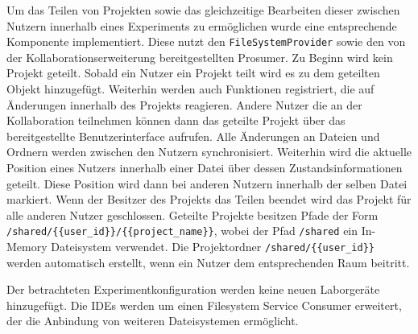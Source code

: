 Um das Teilen von Projekten sowie das gleichzeitige Bearbeiten dieser zwischen Nutzern innerhalb eines Experiments zu ermöglichen wurde eine entsprechende Komponente implementiert. Diese nutzt den \texttt{FileSystemProvider} sowie den von der Kollaborationserweiterung bereitgestellten Prosumer. Zu Beginn wird kein Projekt geteilt. Sobald ein Nutzer ein Projekt teilt wird es zu dem geteilten Objekt hinzugefügt. Weiterhin werden auch Funktionen registriert, die auf Änderungen innerhalb des Projekts reagieren. Andere Nutzer die an der Kollaboration teilnehmen können dann das geteilte Projekt über das bereitgestellte Benutzerinterface aufrufen. Alle Änderungen an Dateien und Ordnern werden zwischen den Nutzern synchronisiert. Weiterhin wird die aktuelle Position eines Nutzers innerhalb einer Datei über dessen Zustandsinformationen geteilt. Diese Position wird dann bei anderen Nutzern innerhalb der selben Datei markiert. Wenn der Besitzer des Projekts das Teilen beendet wird das Projekt für alle anderen Nutzer geschlossen. Geteilte Projekte besitzen Pfade der Form \texttt{/shared/\{\{user\_id\}\}/\{\{project\_name\}\}}, wobei der Pfad \texttt{/shared} ein In-Memory Dateisystem verwendet. Die Projektordner \texttt{/shared/\{\{user\_id\}\}} werden automatisch erstellt, wenn ein Nutzer dem entsprechenden Raum beitritt.

Der betrachteten Experimentkonfiguration werden keine neuen Laborgeräte hinzugefügt. Die IDEs werden um einen Filesystem Service Consumer erweitert, der die Anbindung von weiteren Dateisystemen ermöglicht.